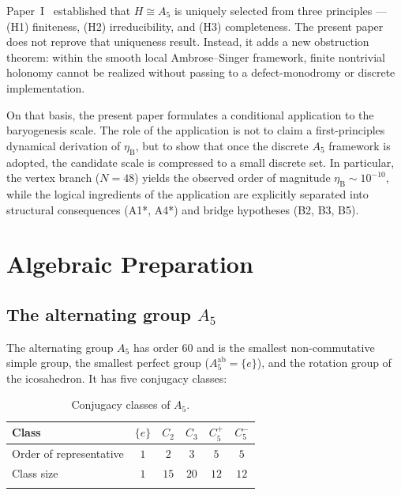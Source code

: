 \documentclass[sn-mathphys-num,Numbered]{sn-jnl}
\theoremstyle{thmstyleone}
\theoremstyle{thmstylethree}
\theoremstyle{thmstyletwo}
\newcommand{\etaB}{\eta_{\mathrm{B}}}
\begin{document}
Paper~I~\cite{PaperI} established that $H \cong A_5$ is uniquely
selected from three principles --- (H1) finiteness, (H2) irreducibility,
and (H3) completeness. The present paper does not reprove that
uniqueness result. Instead, it adds a new obstruction theorem:
within the smooth local Ambrose--Singer framework, finite nontrivial
holonomy cannot be realized without passing to a defect-monodromy or
discrete implementation.

On that basis, the present paper formulates a conditional application to
the baryogenesis scale. The role of the application is not to claim a
first-principles dynamical derivation of $\etaB$, but to show that once
the discrete $A_5$ framework is adopted, the candidate scale is
compressed to a small discrete set. In particular, the vertex branch
($N=48$) yields the observed order of magnitude $\etaB \sim 10^{-10}$,
while the logical ingredients of the application are explicitly
separated into structural consequences (A1*, A4*) and bridge hypotheses
(B2, B3, B5).

\section{Algebraic Preparation}
\label{sec:algebra}

\subsection{The alternating group \texorpdfstring{$A_5$}{A5}}
\label{ssec:A5}

The alternating group $A_5$ has order $60$ and is the smallest
non-commutative simple group, the smallest perfect group
($A_5^{\mathrm{ab}} = \{e\}$), and the rotation group of the
icosahedron. It has five conjugacy classes:

\begin{table}[h]
\caption{Conjugacy classes of $A_5$.}
\label{tab:conjugacy}
\begin{tabular}{@{}lccccc@{}}
\toprule
Class & $\{e\}$ & $C_2$ & $C_3$ & $C_5^+$ & $C_5^-$ \\
\midrule
Order of representative & $1$ & $2$ & $3$ & $5$ & $5$ \\
Class size              & $1$ & $15$ & $20$ & $12$ & $12$ \\
\botrule
\end{tabular}
\end{table}
\end{document}
